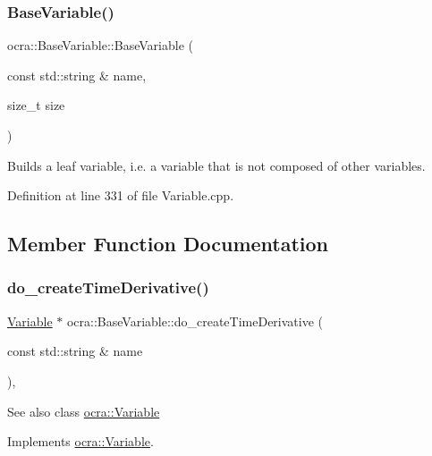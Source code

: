\subsubsection{\texorpdfstring{Base\+Variable()}{BaseVariable()}}
{\footnotesize\ttfamily ocra\+::\+Base\+Variable\+::\+Base\+Variable (\begin{DoxyParamCaption}\item[{const std\+::string \&}]{name,  }\item[{size\+\_\+t}]{size }\end{DoxyParamCaption})}



Builds a leaf variable, i.\+e. a variable that is not composed of other variables. 



Definition at line 331 of file Variable.\+cpp.



\subsection{Member Function Documentation}
\hypertarget{classocra_1_1BaseVariable_a064b6501c110661e9fa12a0250d4de6b}{}\label{classocra_1_1BaseVariable_a064b6501c110661e9fa12a0250d4de6b} 
\subsubsection{\texorpdfstring{do\+\_\+create\+Time\+Derivative()}{do\_createTimeDerivative()}}
{\footnotesize\ttfamily \hyperlink{classocra_1_1Variable}{Variable} $\ast$ ocra\+::\+Base\+Variable\+::do\+\_\+create\+Time\+Derivative (\begin{DoxyParamCaption}\item[{const std\+::string \&}]{name }\end{DoxyParamCaption})\hspace{0.3cm}{\ttfamily [protected]}, {\ttfamily [virtual]}}

\begin{DoxySeeAlso}{See also}
class \hyperlink{classocra_1_1Variable}{ocra\+::\+Variable} 
\end{DoxySeeAlso}


Implements \hyperlink{classocra_1_1Variable_aaed3c9bb3258cc1120ae8f93722a12bb}{ocra\+::\+Variable}.



